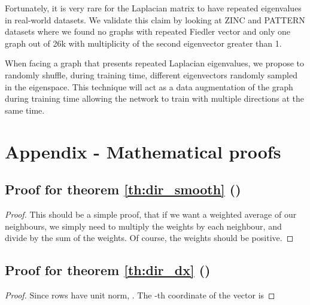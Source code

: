 \documentclass{article} \usepackage{arxiv,times}
\begin{document}
Fortunately, it is very rare for the Laplacian matrix to have repeated eigenvalues in real-world datasets.
We validate this claim by looking at ZINC and PATTERN datasets where we found no graphs with repeated Fiedler vector and only one graph out of 26k with multiplicity of the second eigenvector greater than 1.

When facing a graph that presents repeated Laplacian eigenvalues, we propose to randomly shuffle, during training time, different eigenvectors randomly sampled in the eigenspace. This technique will act as a data augmentation of the graph during training time allowing the network to train with multiple directions at the same time. 


\section{Appendix - Mathematical proofs}

\subsection{Proof for theorem \ref{th:dir_smooth} ()}
\label{app:proof:dir_smooth}

\begin{proof}
This should be a simple proof, that if we want a weighted average of our neighbours, we simply need to multiply the weights by each neighbour, and divide by the sum of the weights. Of course, the weights should be positive.

\end{proof}


\subsection{Proof for theorem \ref{th:dir_dx} ()}
\label{app:proof:dir_dx}

\begin{proof}
Since  rows have unit  norm, . The -th coordinate of the vector  is 


\end{proof}
\end{document}
